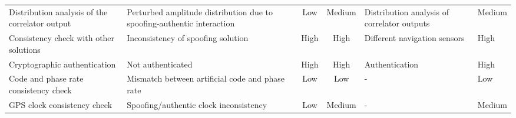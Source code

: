 \begin{table}[H]
\begin{center}
{{\begin{tabular}{ m{40mm}|m{35mm}|c|c|m{30mm}|m{20mm} }
                Distribution analysis of the correlator output & Perturbed amplitude distribution due to spoofing-authentic interaction & Low & Medium & Distribution
                analysis of correlator outputs & Medium \\
                Consistency check with other solutions & Inconsistency of spoofing solution & High & High & Different navigation sensors & High \\
                Cryptographic authentication & Not authenticated & High & High & Authentication & High \\
                Code and phase rate consistency check & Mismatch between artificial code and phase rate & Low & Low & - & Low \\
                GPS clock consistency check & Spoofing/authentic clock inconsistency & Low & Medium & - & Medium \\ 
                \hline
            \end{tabular}
        }
        }
    \end{center}
\end{table}
\renewcommand{\arraystretch}{1}

\renewcommand{\arraystretch}{1.2}
\begin{table}[H]
    \begin{center}
        \caption{Summary of Spoofing Mitigation Methods from \cite{RN6}}
        \label{tab:SpoofMitigateSum}
    \end{center}
\end{table}
\renewcommand{\arraystretch}{1}

